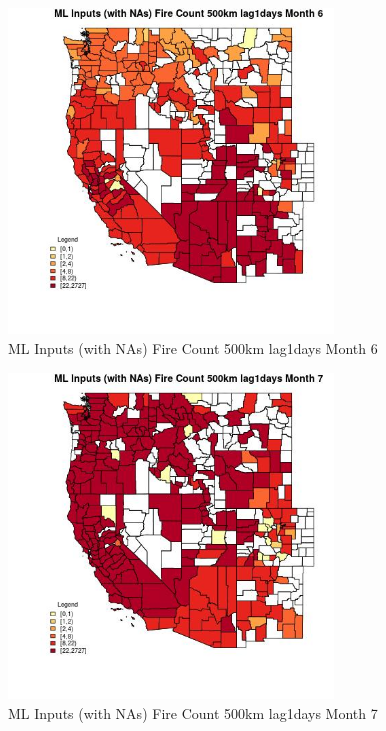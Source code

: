\begin{figure} 
\centering  
\includegraphics[width=0.77\textwidth]{Code_Outputs/Report_ML_input_PM25_Step4_part_f_de_duplicated_aveswNAs_CountyFire_Count_500km_lag1daysmedianMonth6.jpg} 
\caption{\label{fig:Report_ML_input_PM25_Step4_part_f_de_duplicated_aveswNAsCountyFire_Count_500km_lag1daysmedianMonth6}ML Inputs (with NAs) Fire Count 500km lag1days Month 6} 
\end{figure} 
 

\clearpage 

\begin{figure} 
\centering  
\includegraphics[width=0.77\textwidth]{Code_Outputs/Report_ML_input_PM25_Step4_part_f_de_duplicated_aveswNAs_CountyFire_Count_500km_lag1daysmedianMonth7.jpg} 
\caption{\label{fig:Report_ML_input_PM25_Step4_part_f_de_duplicated_aveswNAsCountyFire_Count_500km_lag1daysmedianMonth7}ML Inputs (with NAs) Fire Count 500km lag1days Month 7} 
\end{figure} 
 

